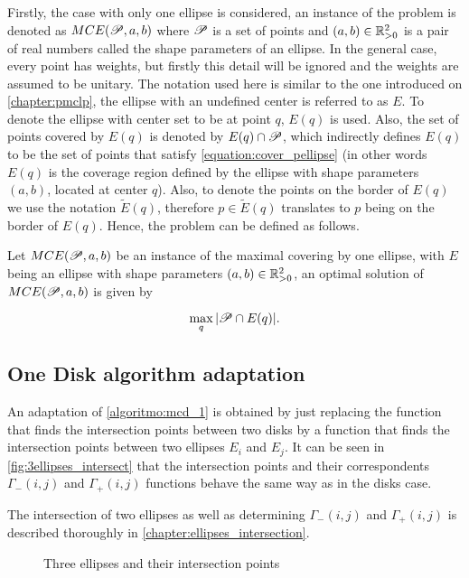 Firstly, the case with only one ellipse is considered, an instance of the problem is denoted as $MCE(\mathscr{P}, a, b)$ where $\mathscr{P}$ is a set of points and $(a,b) \in \mathbb{R}_{>0}^2$ is a pair of real numbers called the shape parameters of an ellipse. 
In the general case, every point has weights, but firstly this detail will be ignored and the weights are assumed to be unitary.
The notation used here is similar to the one introduced on \autoref{chapter:pmclp}, the ellipse with an undefined center is referred to as $E$. To denote the ellipse with center set to be at point $q$, $E(q)$ is used. Also, the set of points covered by $E(q)$ is denoted by $E(q) \cap \mathscr{P}$, which indirectly defines $E(q)$ to be the set of points that satisfy \autoref{equation:cover_pellipse} (in other words $E(q)$ is the coverage region defined by the ellipse with shape parameters $(a,b)$, located at center $q$). 
Also, to denote the points on the border of $E(q)$ we use the notation $\tilde{E}(q)$, therefore $p \in \tilde{E}(q)$ translates to $p$ being on the border of $E(q)$.
Hence, the problem can be defined as follows.

\begin{definicao}
Let $MCE(\mathscr{P}, a, b)$ be an instance of the maximal covering by one ellipse, with $E$ being an ellipse with shape parameters $(a,b) \in \mathbb{R}_{>0}^2$, an optimal solution of $MCE(\mathscr{P}, a, b)$ is given by

\begin{equation}
    \max_q |\mathscr{P} \cap E(q)|.
\end{equation}
\end{definicao}

\subsection{One Disk algorithm adaptation}

An adaptation of \autoref{algoritmo:mcd_1} is obtained by just replacing the function that finds the intersection points between two disks by a function that finds the intersection points between two ellipses $E_i$ and $E_j$.
It can be seen in \autoref{fig:3ellipses_intersect} that the intersection points and their correspondents $\Gamma_-(i,j)$ and $\Gamma_+(i,j)$ functions behave the same way as in the disks case.

The intersection of two ellipses as well as determining $\Gamma_-(i,j)$ and $\Gamma_+(i,j)$ is described thoroughly in \autoref{chapter:ellipses_intersection}. 


\begin{figure}[H]
\centering

    \caption{Three ellipses and their intersection points}
    
    \fautor
    \label{fig:3ellipses_intersect}
\end{figure}

